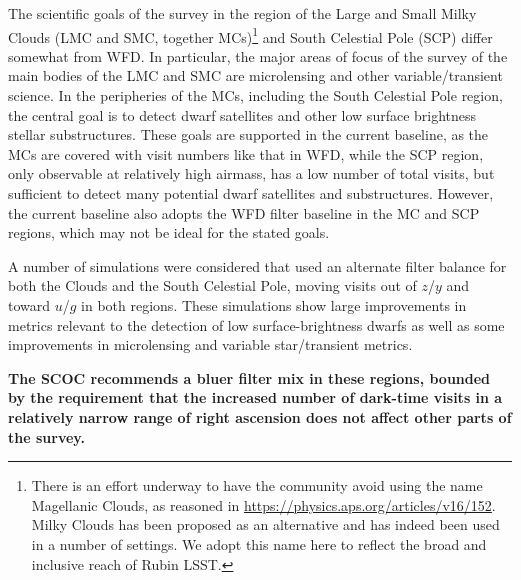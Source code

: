 The scientific goals of the survey in the region of the Large and Small Milky Clouds (LMC and SMC, together MCs)\footnote{There is an effort underway to have the community avoid using the name Magellanic Clouds, as reasoned in \url{https://physics.aps.org/articles/v16/152}. Milky Clouds has been proposed as an alternative and has indeed been used in a number of settings. We adopt this name here to reflect the broad and inclusive reach of Rubin LSST.} and South Celestial Pole (SCP) differ somewhat from WFD. In particular, the major areas of focus of the survey of the main bodies of the LMC and SMC are microlensing and other variable/transient science. In the peripheries of the MCs, including the South Celestial Pole region, the central goal is to detect dwarf satellites and other low surface brightness stellar substructures.
These goals are supported in the current baseline, as the MCs are covered with visit numbers like that in WFD, while the SCP region, only observable at relatively high airmass, has a low number of total visits, but sufficient to detect many potential dwarf satellites and substructures. However, the current baseline also adopts the WFD filter baseline in the MC and SCP regions, which may not be ideal for the stated goals.


A number of simulations were considered that used an alternate filter balance for both the Clouds and the South Celestial Pole, moving visits out of $z$/$y$ and toward $u$/$g$ in both regions. These simulations show large improvements in metrics relevant to the detection of low surface-brightness dwarfs as well as some improvements in microlensing and variable star/transient metrics. 

{\bf The SCOC recommends a bluer filter mix in these regions, bounded by the requirement that the increased number of dark-time visits in a relatively narrow range of right ascension does not affect other parts of the survey.} 

